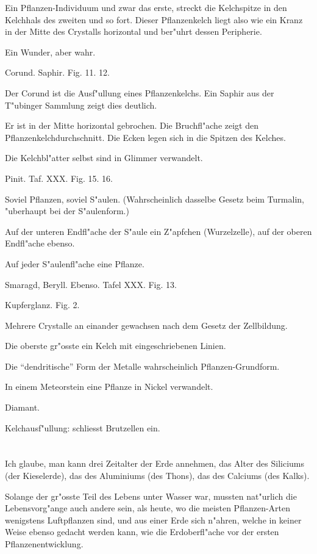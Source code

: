 \documentclass[a4paper, 11pt, oneside, german]{article}
\begin{document}
Ein Pflanzen-Individuum und zwar das erste, streckt die Kelchspitze in den Kelchhals des zweiten und so fort. Dieser Pflanzenkelch liegt also wie ein Kranz in der Mitte des Crystalls horizontal und ber"uhrt dessen Peripherie.

Ein Wunder, aber wahr.

Corund. Saphir. Fig. 11. 12.

Der Corund ist die Ausf"ullung eines Pflanzenkelchs. Ein Saphir aus der T"ubinger Sammlung zeigt dies deutlich.

Er ist in der Mitte horizontal gebrochen. Die Bruchfl"ache zeigt den Pflanzenkelchdurchschnitt. Die Ecken legen sich in die Spitzen des Kelches.

Die Kelchbl"atter selbst sind in Glimmer verwandelt.

Pinit. Taf. XXX. Fig. 15. 16.

Soviel Pflanzen, soviel S"aulen. (Wahrscheinlich dasselbe Gesetz beim Turmalin, "uberhaupt bei der S"aulenform.)

Auf der unteren Endfl"ache der S"aule ein Z"apfchen (Wurzelzelle), auf der oberen Endfl"ache ebenso.

Auf jeder S"aulenfl"ache eine Pflanze.

Smaragd, Beryll. Ebenso. Tafel XXX. Fig. 13.

Kupferglanz. Fig. 2.

Mehrere Crystalle an einander gewachsen nach dem Gesetz der Zellbildung.

Die oberste gr"osste ein Kelch mit eingeschriebenen Linien.

Die "`dendritische"' Form der Metalle wahrscheinlich Pflanzen-Grundform.

In einem Meteorstein eine Pflanze in Nickel verwandelt.

Diamant.

Kelchausf"ullung: schliesst Brutzellen ein.
\clearpage
\section{}
\paragraph{}
Ich glaube, man kann drei Zeitalter der Erde annehmen, das Alter des Siliciums (der Kieselerde), das des Aluminiums (des Thons), das des Calciums (des Kalks).

Solange der gr"osste Teil des Lebens unter Wasser war, mussten nat"urlich die Lebensvorg"ange auch andere sein, als heute, wo die meisten Pflanzen-Arten wenigstens Luftpflanzen sind, und aus einer Erde sich n"ahren, welche in keiner Weise ebenso gedacht werden kann, wie die Erdoberfl"ache vor der ersten Pflanzenentwicklung.
\end{document}
